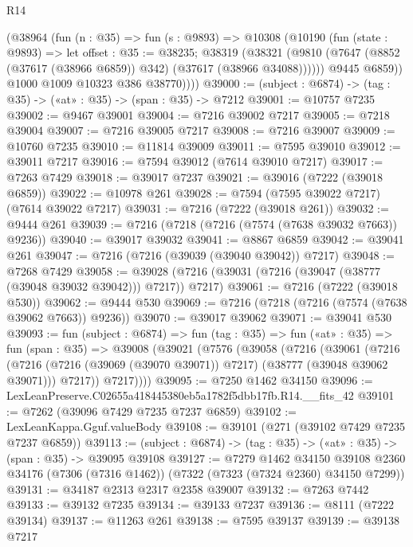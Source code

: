 \begin{lexlean}{R14}
\begin{coremodule}
          (@38964
            (fun (n : @35) =>
            fun (s : @9893) =>
            @10308
              (@10190
                (fun (state : @9893) =>
                let offset : @35 := @38235;
                @38319
                  (@38321
                    (@9810 (@7647 (@8852 (@37617 (@38966 @6859)) @342) (@37617 (@38966 @34088))))))
                @9445
                @6859))
            @1000
            @1009
            @10323
            @386
            @38770))))
@39000 := (subject : @6874) -> (tag : @35) -> («at» : @35) -> (span : @35) -> @7212
@39001 := @10757 @7235
@39002 := @9467 @39001
@39004 := @7216 @39002 @7217
@39005 := @7218 @39004
@39007 := @7216 @39005 @7217
@39008 := @7216 @39007
@39009 := @10760 @7235
@39010 := @11814 @39009
@39011 := @7595 @39010
@39012 := @39011 @7217
@39016 := @7594 @39012 (@7614 @39010 @7217)
@39017 := @7263 @7429
@39018 := @39017 @7237
@39021 := @39016 (@7222 (@39018 @6859))
@39022 := @10978 @261
@39028 := @7594 (@7595 @39022 @7217) (@7614 @39022 @7217)
@39031 := @7216 (@7222 (@39018 @261))
@39032 := @9444 @261
@39039 := @7216 (@7218 (@7216 (@7574 (@7638 @39032 @7663)) @9236))
@39040 := @39017 @39032
@39041 := @8867 @6859
@39042 := @39041 @261
@39047 := @7216 (@7216 (@39039 (@39040 @39042)) @7217)
@39048 := @7268 @7429
@39058 := @39028 (@7216 (@39031 (@7216 (@39047 (@38777 (@39048 @39032 @39042))) @7217)) @7217)
@39061 := @7216 (@7222 (@39018 @530))
@39062 := @9444 @530
@39069 := @7216 (@7218 (@7216 (@7574 (@7638 @39062 @7663)) @9236))
@39070 := @39017 @39062
@39071 := @39041 @530
@39093 := fun (subject : @6874) =>
  fun (tag : @35) =>
  fun («at» : @35) =>
  fun (span : @35) =>
  @39008
    (@39021
      (@7576
        (@39058
          (@7216
            (@39061
              (@7216
                (@7216 (@7216 (@39069 (@39070 @39071)) @7217) (@38777 (@39048 @39062 @39071)))
                @7217))
            @7217))))
@39095 := @7250 @1462 @34150
@39096 := LexLeanPreserve.C02655a418445380eb5a1782f5dbb17fb.R14.__fits_42
@39101 := @7262 (@39096 @7429 @7235 @7237 @6859)
@39102 := LexLeanKappa.Gguf.valueBody
@39108 := @39101 (@271 (@39102 @7429 @7235 @7237 @6859))
@39113 := (subject : @6874) -> (tag : @35) -> («at» : @35) -> (span : @35) -> @39095 @39108
@39127 := @7279
    @1462
    @34150
    @39108
    @2360
    @34176
    (@7306 (@7316 @1462))
    (@7322 (@7323 (@7324 @2360) @34150 @7299))
@39131 := @34187 @2313 @2317 @2358 @39007
@39132 := @7263 @7442
@39133 := @39132 @7235
@39134 := @39133 @7237
@39136 := @8111 (@7222 @39134)
@39137 := @11263 @261
@39138 := @7595 @39137
@39139 := @39138 @7217

\end{coremodule}
\end{lexlean}
